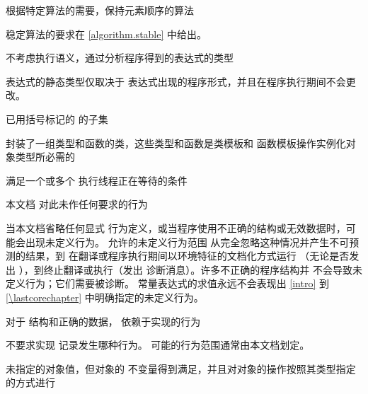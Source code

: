 %
%
根据特定算法的需要，保持元素顺序的算法

\begin{defnote}
稳定算法的要求在 \ref{algorithm.stable} 中给出。
\end{defnote}

%
不考虑执行语义，通过分析程序得到的表达式的类型

\begin{defnote}
表达式的静态类型仅取决于
表达式出现的程序形式，并且在程序执行期间不会更改。
\end{defnote}

%
已用括号标记的  的子集

%
封装了一组类型和函数的类，这些类型和函数是类模板和
函数模板操作实例化对象类型所必需的

%
满足一个或多个  执行线程正在等待的条件

%
本文档
对此未作任何要求的行为

\begin{defnote}
当本文档省略任何显式
行为定义，或当程序使用不正确的结构或无效数据时，可能会出现未定义行为。
允许的未定义行为范围
从完全忽略这种情况并产生不可预测的结果，到
在翻译或程序执行期间以环境特征的文档化方式运行
（无论是否发出 ），到终止翻译或执行（发出
诊断消息）。许多不正确的程序结构并
不会导致未定义行为；它们需要被诊断。
常量表达式的求值永远不会表现出 \ref{intro} 到 \ref{\lastcorechapter} 中明确指定的未定义行为。
\end{defnote}

%
对于  结构和正确的数据，
依赖于实现的行为

\begin{defnote}
不要求实现
记录发生哪种行为。
可能的行为范围通常由本文档划定。
\end{defnote}

%
未指定的对象值，但对象的
不变量得到满足，并且对对象的操作按照其类型指定的方式进行

